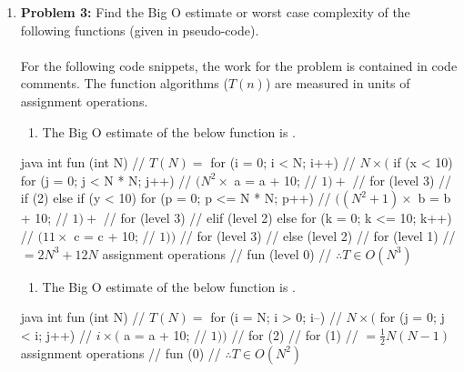 \documentclass[12pt, a4paper]{article}
\begin{document}
\begin{enumerate}
	\item \textbf{Problem 3:} Find the Big O estimate or worst case complexity of the following functions (given in pseudo-code). \label{3}\\\\
		For the following code snippets, the work for the problem is contained in code comments.
		The function algorithms ($T(n)$) are measured in units of assignment operations.
		\begin{enumerate} %
		\item The Big O estimate of the below function is .
		\end{enumerate}\begin{mymintedunbreakablecodeblock}{java}
			int fun (int N) {                   // $T(N) =$
			  for (i = 0; i < N; i++) {         // $N \times ($
			    if (x < 10) {
			      for (j = 0; j < N * N; j++) { // $(N^2 \times$
			        a = a + 10;                 // $1) +$
			      } // for (level 3)
			    } // if (2)
			    else if (y < 10) {
			      for (p = 0; p <= N * N; p++) {// $((N^2 + 1)\times$
			        b = b + 10;                 // $1) +$
			      } // for (level 3)
			    } // elif (level 2)
			    else {
			      for (k = 0; k <= 10; k++) {   // $(11\times$
			        c = c + 10;                 // $1))$
			      } // for (level 3)
			    } // else (level 2)
			  } // for (level 1)
			    // $= 2N^3 + 12N$ assignment operations
			} // fun (level 0)                  // $\therefore T \in O(N^3)$\end{mymintedunbreakablecodeblock}
			\label{3(a)} %
		
		\begin{enumerate}[resume]
		\item The Big O estimate of the below function is .
		\end{enumerate}\begin{mymintedunbreakablecodeblock}{java}
			int fun (int N) {                   // $T(N) =$
			  for (i = N; i > 0; i--) {         // $N\times ($
			    for (j = 0; j < i; j++) {       // $i\times ($
			      a = a + 10;                   // $1))$
			    } // for (2)
			  } // for (1)
			    // $= \frac{1}{2}N(N - 1)$ assignment operations
			} // fun (0)                        // $\therefore T \in O(N^2)$\end{mymintedunbreakablecodeblock}
			\label{3(b)} %


\end{enumerate}
\end{document}
